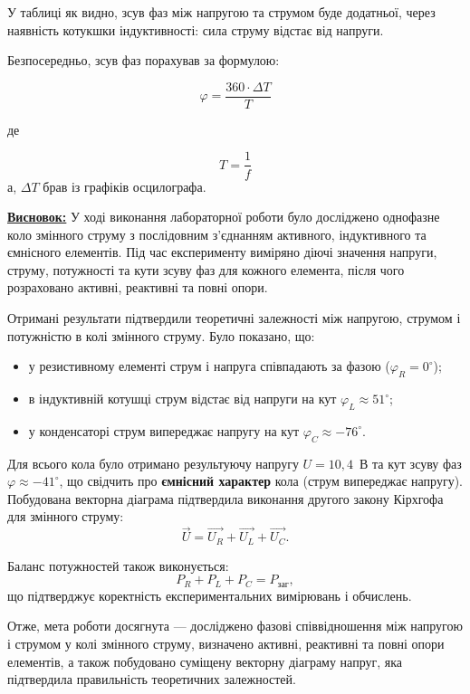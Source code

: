\documentclass[12pt,a4paper]{article}
\begin{document}
    У таблиці як видно, зсув фаз між напругою та струмом буде додатньої, через наявність котукшки індуктивності: сила струму відстає від напруги.

    Безпосередньо, зсув фаз порахував за формулою:

    \[
    \varphi = \frac{360 \cdot \Delta T}{T}
    \]

    де

    \[
    T = \frac{1}{f}
    \]
    а, $\Delta T$ брав із графіків осцилографа.

    \vspace{1em}

    \noindent
    \textbf{\underline{Висновок:}} У ході виконання лабораторної роботи було досліджено однофазне коло змінного струму з послідовним з’єднанням активного, індуктивного та ємнісного елементів. 
    Під час експерименту виміряно діючі значення напруги, струму, потужності та кути зсуву фаз для кожного елемента, після чого розраховано активні, реактивні та повні опори.

    Отримані результати підтвердили теоретичні залежності між напругою, струмом і потужністю в колі змінного струму. 
    Було показано, що:

    \begin{itemize}
        \item у резистивному елементі струм і напруга співпадають за фазою ($\varphi_R = 0^\circ$);
        \item в індуктивній котушці струм відстає від напруги на кут $\varphi_L \approx 51^\circ$;
        \item у конденсаторі струм випереджає напругу на кут $\varphi_C \approx -76^\circ$.
    \end{itemize}

    Для всього кола було отримано результуючу напругу $U = 10{,}4$~В та кут зсуву фаз $\varphi \approx -41^\circ$, що свідчить про \textbf{ємнісний характер} кола (струм випереджає напругу). 
    Побудована векторна діаграма підтвердила виконання другого закону Кірхгофа для змінного струму:
    \[
    \vec{U} = \vec{U_R} + \vec{U_L} + \vec{U_C}.
    \]

    Баланс потужностей також виконується:
    \[
    P_R + P_L + P_C = P_{\text{заг}},
    \]
    що підтверджує коректність експериментальних вимірювань і обчислень.

    Отже, мета роботи досягнута — досліджено фазові співвідношення між напругою і струмом у колі змінного струму, визначено активні, реактивні та повні опори елементів, а також побудовано суміщену векторну діаграму напруг, яка підтвердила правильність теоретичних залежностей.
\end{document}

